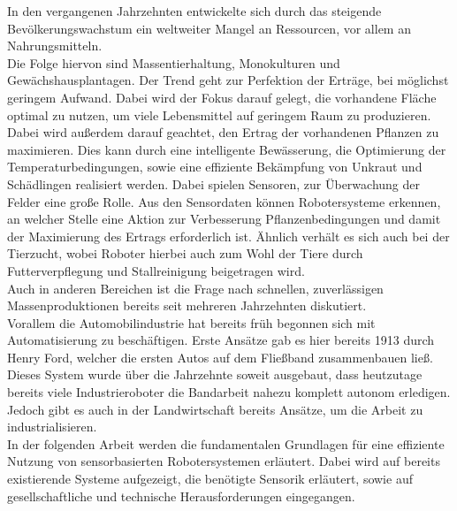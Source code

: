 In den vergangenen Jahrzehnten entwickelte sich durch das steigende
Bevölkerungswachstum ein weltweiter Mangel an Ressourcen, vor allem an
Nahrungsmitteln.\\Die Folge
hiervon sind Massentierhaltung, Monokulturen und Gewächshausplantagen. Der
Trend geht zur Perfektion der Erträge, bei möglichst geringem Aufwand. Dabei
wird der Fokus darauf gelegt, die vorhandene Fläche optimal zu nutzen, um viele
Lebensmittel auf geringem Raum zu produzieren. Dabei wird außerdem darauf
geachtet, den Ertrag der vorhandenen Pflanzen zu maximieren. Dies kann durch
eine intelligente Bewässerung, die Optimierung der Temperaturbedingungen, sowie
eine effiziente Bekämpfung von Unkraut und Schädlingen realisiert werden. Dabei
spielen Sensoren, zur Überwachung der Felder eine große Rolle. Aus den
Sensordaten können Robotersysteme erkennen, an welcher Stelle eine Aktion zur
Verbesserung Pflanzenbedingungen und damit der Maximierung des Ertrags
erforderlich ist. Ähnlich verhält es sich auch bei der Tierzucht, wobei Roboter
hierbei auch zum Wohl der Tiere durch Futterverpflegung und Stallreinigung
beigetragen wird. \\Auch in anderen Bereichen ist die Frage nach schnellen,
zuverlässigen Massenproduktionen bereits seit mehreren Jahrzehnten diskutiert.
\\Vorallem die Automobilindustrie hat bereits früh begonnen sich mit
Automatisierung zu beschäftigen. Erste Ansätze gab es hier bereits 1913\cite{raff1987did} durch
Henry Ford, welcher die ersten Autos auf dem Fließband zusammenbauen ließ.
Dieses System wurde über die Jahrzehnte soweit ausgebaut, dass heutzutage
bereits viele Industrieroboter die Bandarbeit nahezu komplett autonom
erledigen. \\Jedoch gibt es auch in der Landwirtschaft bereits Ansätze, um die
Arbeit zu industrialisieren. \\In der folgenden Arbeit werden die fundamentalen
Grundlagen für eine effiziente Nutzung von sensorbasierten Robotersystemen
erläutert. Dabei wird auf bereits existierende Systeme aufgezeigt, die
benötigte Sensorik erläutert, sowie auf gesellschaftliche und technische
Herausforderungen eingegangen.